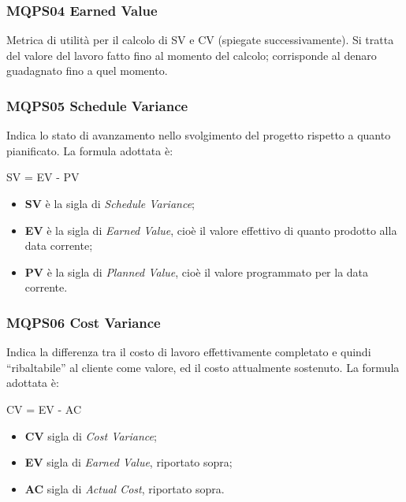 \subsubsection{MQPS04 Earned Value}\label{ProcessiOrganizzativiProcessoDiPianificazioneMetricheMQPS04EarnedValue}
Metrica di utilità per il calcolo di SV e CV (spiegate successivamente).
Si tratta del valore del lavoro fatto fino al momento del calcolo;
corrisponde al denaro guadagnato fino a quel momento.

\subsubsection{MQPS05 Schedule Variance}\label{ProcessiOrganizzativiProcessoDiPianificazioneMetricheMQPS05ScheduleVariance}
Indica lo stato di avanzamento nello svolgimento del progetto rispetto a quanto pianificato.
La formula adottata è: 
	\begin{center}
		SV = EV - PV
	\end{center}
\begin{itemize}
	\item \textbf{SV} è la sigla di \textit{Schedule Variance};
	\item \textbf{EV} è la sigla di \textit{Earned Value}, cioè il valore effettivo di quanto prodotto alla data corrente;
	\item \textbf{PV} è la sigla di \textit{Planned Value}, cioè il valore programmato per la data corrente.	
\end{itemize}

\subsubsection{MQPS06 Cost Variance}\label{ProcessiOrganizzativiProcessoDiPianificazioneMetricheMQPS06CostVariance}
Indica la differenza tra il costo di lavoro effettivamente completato e quindi “ribaltabile” al cliente come valore,  ed il costo attualmente sostenuto.
La formula adottata è:
	\begin{center}
		CV = EV - AC
	\end{center}
\begin{itemize}
	\item \textbf{CV} sigla di \textit{Cost Variance};
	\item \textbf{EV} sigla di \textit{Earned Value}, riportato sopra;
	\item \textbf{AC} sigla di \textit{Actual Cost}, riportato sopra.
\end{itemize}


